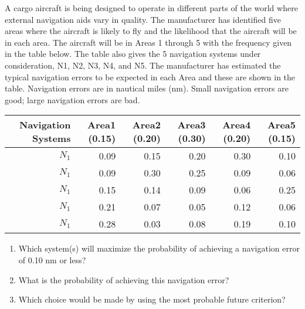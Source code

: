 \begin{exercises}
    \begin{exercise}
    \label{sea-07-40}
        A cargo aircraft is being designed to operate in different parts of the world where external navigation aids vary in quality.  The manufacturer has identified five areas where the aircraft is likely to fly and the likelihood that the aircraft will be in each area. The aircraft will be in Areas 1 through 5 with the frequency given in the table below. The table also gives the 5 navigation systems under consideration, N1, N2, N3, N4, and N5. The manufacturer has estimated the typical navigation errors to be expected in each Area and these are shown in the table. Navigation errors are in nautical miles (nm). Small navigation errors are good; large navigation errors are bad.
        \begin{table}[h]
        \centering
        \begin{tabular}{r r r r r r}
        \toprule
        \textbf{Navigation Systems} & \textbf{Area1 (0.15)} & \textbf{Area2 (0.20)} & \textbf{Area3 (0.30)} & \textbf{Area4 (0.20)} & \textbf{Area5 (0.15)} \\
        \midrule
        $N_1$ & 0.09 & 0.15 & 0.20 & 0.30 & 0.10 \\
        $N_1$ & 0.09 & 0.30 & 0.25 & 0.09 & 0.06 \\
        $N_1$ & 0.15 & 0.14 & 0.09 & 0.06 & 0.25 \\
        $N_1$ & 0.21 & 0.07 & 0.05 & 0.12 & 0.06 \\
        $N_1$ & 0.28 & 0.03 & 0.08 & 0.19 & 0.10 \\
        \bottomrule
        \end{tabular}
        \label{tab:sea-07-40} %
        \end{table}
        \begin{enumerate}[label=\alph*)]
            \item Which system(s) will maximize the probability of achieving a navigation error of 0.10 nm or less?
            \item What is the probability of achieving this navigation error?
            \item Which choice would be made by using the most probable future criterion?
        \end{enumerate}
    \end{exercise}
    \begin{solution}
    \end{solution}
    

\end{exercises}

